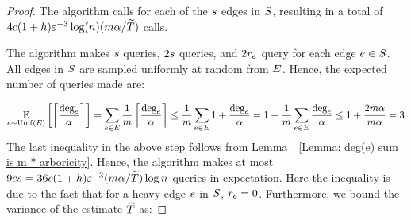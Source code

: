 \begin{proof}
        The algorithm calls \exactheavyoracle{} for each of the $s$ edges in $S$, resulting in a total of $4c(1+h)\varepsilon^{-3}\log(n)(m\alpha/\widetilde{T})$ calls. 

        The algorithm makes $s$ \randedgeq{} queries, $2s$ \degreeq{} queries, and $2r_e$ \neighbourq{} query for each edge $e \in S$. All edges in $S$ are sampled uniformly at random from $E$. Hence, the expected number of \neighbourq{} queries made are: 
        
        $$\operatorname*{\mathbb{E}}_{e \sim \mathrm{Unif}\left({E}\right)} \left[ \left\lceil{\frac{\mbox{deg}_{e}}{\alpha}}\right\rceil \right] = \sum_{e \in E} \frac{1}{m} \left\lceil{\frac{\mbox{deg}_{e}}{\alpha}}\right\rceil \leq \frac{1}{m} \sum_{e \in E} 1 + \frac{\mbox{deg}_{e}}{\alpha} = 1 + \frac{1}{m} \sum_{e \in E} \frac{\mbox{deg}_{e}}{\alpha} \leq 1 + \frac{2m\alpha}{m\alpha} = 3$$
        The last inequality in the above step follows from Lemma~~\ref{Lemma: deg(e) sum is m * arboricity}.
        Hence, the algorithm makes at most $9cs = 36c(1+h)\varepsilon^{-3}(m\alpha/\widetilde{T}) \log n$ queries in expectation. Here the inequality is due to the fact that for a heavy edge $e$ in $S$, $r_e = 0$. Furthermore, we bound the variance of the estimate $\widehat{T}$ as:
        
        

\end{proof}
